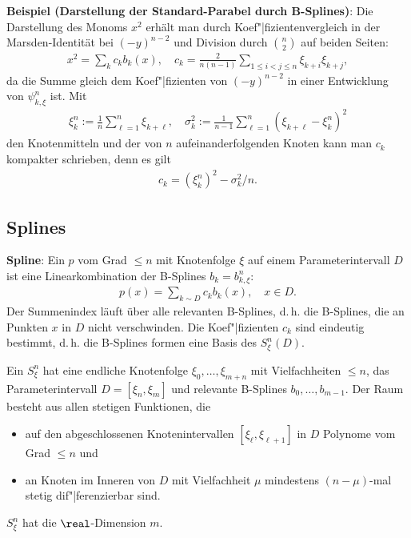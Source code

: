 \linie

\textbf{Beispiel (Darstellung der Standard-Parabel durch B-Splines)}:
Die Darstellung des Monoms $x^2$ erhält man durch Koef"|fizientenvergleich in der Marsden-Identität
bei $(-y)^{n-2}$ und Division durch $\binom{n}{2}$ auf beiden Seiten:
\begin{align*}
    x^2 = \sum_k c_k b_k(x),\quad
    c_k = \frac{2}{n(n - 1)} \sum_{1 \le i < j \le n} \xi_{k+i}\xi_{k+j},
\end{align*}
da die Summe gleich dem Koef"|fizienten von $(-y)^{n-2}$ in einer Entwicklung von $\psi_{k,\xi}^n$
ist.
Mit
\begin{align*}
    \xi_k^n := \frac{1}{n} \sum_{\ell=1}^n \xi_{k+\ell},\quad
    \sigma_k^2 := \frac{1}{n - 1} \sum_{\ell=1}^n (\xi_{k+\ell} - \xi_k^n)^2
\end{align*}
den Knotenmitteln und der  von $n$ aufeinanderfolgenden Knoten kann
man $c_k$ kompakter schrieben, denn es gilt
\begin{align*}
    c_k = (\xi_k^n)^2 - \sigma_k^2/n.
\end{align*}

\subsection{%
    Splines%
}

\textbf{Spline}:
Ein  $p$ vom Grad $\le n$ mit Knotenfolge $\xi$ auf einem Parameterintervall $D$
ist eine Linearkombination der B-Splines $b_k = b_{k,\xi}^n$:
\begin{align*}
    p(x) = \sum_{k \sim D} c_k b_k(x),\quad
    x \in D.
\end{align*}
Der Summenindex läuft über alle relevanten B-Splines, d.\,h. die B-Splines, die an Punkten $x$ in
$D$ nicht verschwinden.
Die Koef"|fizienten $c_k$ sind eindeutig bestimmt, d.\,h. die B-Splines formen eine Basis des
 $S_\xi^n(D)$.

Ein  $S_\xi^n$ hat eine endliche Knotenfolge
$\xi_0, \dotsc, \xi_{m+n}$ mit Vielfachheiten $\le n$, das Parameterintervall $D = [\xi_n, \xi_m]$
und relevante B-Splines $b_0, \dotsc, b_{m-1}$.
Der Raum besteht aus allen stetigen Funktionen, die
\begin{itemize}
    \item
    auf den abgeschlossenen Knotenintervallen $[\xi_\ell, \xi_{\ell+1}]$ in $D$
    Polynome vom Grad $\le n$ und
    
    \item
    an Knoten im Inneren von $D$ mit Vielfachheit $\mu$
    mindestens $(n - \mu)$-mal stetig dif"|ferenzierbar sind.
\end{itemize}
$S_\xi^n$ hat die $\real$-Dimension $m$.

